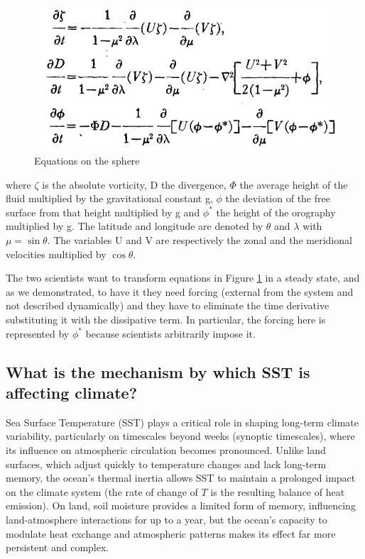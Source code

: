 \begin{figure}[htp!]
    \centering
    \includegraphics[width=0.5\linewidth]{uploads/19image.png}
    \caption{Equations on the sphere}
    \label{fig: fig 2.2}
    
\end{figure}
where $\zeta$ is the absolute vorticity, D the divergence, $\Phi$
the average height of the fluid multiplied by the gravitational constant g, $\phi$ the deviation of the free surface from that height multiplied by g and $\phi^*$ the height of the orography multiplied by g. The latitude and longitude are denoted by $\theta$ and $\lambda$ with $\mu = \sin \theta$. The variables U and V are respectively the zonal and the meridional velocities multiplied by $\cos \theta$. 


The two scientists want to transform equations in Figure \ref{fig: fig 2.2} in a steady state, and as we demonstrated, to have it they need forcing (external from the system and not described dynamically) and they have to eliminate the time derivative substituting it with the dissipative term. 
In particular, the forcing here is represented by $\phi^*$ because scientists arbitrarily impose it. 

\subsection{What is the mechanism by which SST is affecting climate?}

Sea Surface Temperature (SST) plays a critical role in shaping long-term climate variability, particularly on timescales beyond weeks (synoptic timescales), where its influence on atmospheric circulation becomes pronounced. Unlike land surfaces, which adjust quickly to temperature changes and lack long-term memory, the ocean's thermal inertia allows SST to maintain a prolonged impact on the climate system (the rate of change of $T$ is the resulting balance of heat emission). On land, soil moisture provides a limited form of memory, influencing land-atmosphere interactions for up to a year, but the ocean’s capacity to modulate heat exchange and atmospheric patterns makes its effect far more persistent and complex.

